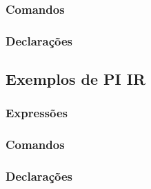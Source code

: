 \subsubsection{Comandos}
\subsubsection{Declarações}

\subsection{Exemplos de PI IR}
\subsubsection{Expressões}
\subsubsection{Comandos}
\subsubsection{Declarações}\label{declarações}